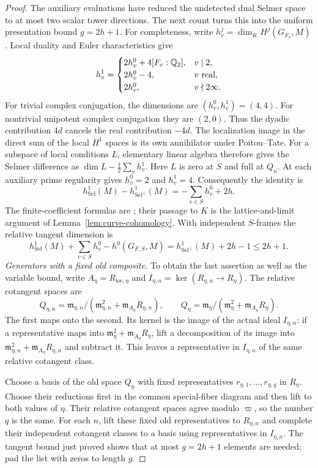 \begin{proof}
The auxiliary evaluations have reduced the undetected dual Selmer
space to at most two scalar tower directions. The next count turns
this into the uniform presentation bound \(g=2h+1\).
For completeness, write $h^j_v=\dim_K H^j(G_{F_v},M)$.
Local duality and Euler characteristics give
\[
 h^1_v=
 \begin{cases}
 2h^0_v+4[F_v:\mathbb Q_2],&v\mid2,\\
 2h^0_v-4,&v\text{ real},\\
 2h^0_v,&v\nmid2\infty.
 \end{cases}
\]
For trivial complex conjugation, the dimensions are
$(h^0_v,h^1_v)=(4,4)$.
For nontrivial unipotent complex conjugation they are $(2,0)$.
Thus the dyadic contribution $4d$ cancels the real contribution
$-4d$.  The localization image in the direct sum of the local
$H^1$ spaces is its own annihilator under Poitou--Tate.
For a subspace of local conditions $L$, elementary linear algebra
therefore gives the Selmer difference as
$\dim L-\tfrac12\sum_v h^1_v$.
Here $L$ is zero at $S$ and full at $Q_n$.
At each auxiliary prime regularity gives $h^0_v=2$ and $h^1_v=4$.
Consequently the identity is
\[
 h^1_{\mathrm{Sel}}(M)-h^1_{\mathrm{Sel}^{\perp}}(M)
   =-\sum_{v\in S}h^0_v+2h.
\]
The finite-coefficient formulas are
\cite[I, Corollary~2.3, Theorems~2.8, 2.13, 4.10, and~5.1]{Milne2006};
their passage to $K$ is the lattice-and-limit argument of
Lemma~\ref{lem:curve-cohomology}.
With independent $S$-frames the relative tangent dimension is
\[
 h^1_{\mathrm{Sel}}(M)+\sum_{v\in S}h^0_v-h^0(G_{F,S},M)
 =h^1_{\mathrm{Sel}^{\perp}}(M)+2h-1
 \leq 2h+1.
\]
\emph{Generators with a fixed old composite.}
To obtain the last assertion as well as the variable bound, write
\(A_\eta=R_{\mathrm{loc},\eta}\) and
\(I_{\eta,n}=\ker(R_{\eta,n}\to R_\eta)\). The relative cotangent
spaces are
\[
 Q_{\eta,n}=\mathfrak m_{\eta,n}/
  (\mathfrak m_{\eta,n}^2+\mathfrak m_{A_\eta}R_{\eta,n}),
 \qquad
 Q_\eta=\mathfrak m_\eta/
  (\mathfrak m_\eta^2+\mathfrak m_{A_\eta}R_\eta).
\]
The first maps onto the second. Its kernel is the image of the
actual ideal \(I_{\eta,n}\): if a representative maps into
\(\mathfrak m_\eta^2+\mathfrak m_{A_\eta}R_\eta\), lift a
decomposition of its image into
\(\mathfrak m_{\eta,n}^2+\mathfrak m_{A_\eta}R_{\eta,n}\) and
subtract it. This leaves a representative in \(I_{\eta,n}\) of the
same relative cotangent class.

Choose a basis of the old space \(Q_\eta\) with fixed representatives
\(r_{\eta,1},\ldots,r_{\eta,q}\) in \(R_\eta\). Choose their
reductions first in the common special-fiber diagram and then lift
to both values of \(\eta\). Their relative cotangent spaces agree
modulo \(\varpi\), so the number \(q\) is the same. For each \(n\),
lift these fixed old representatives to \(R_{\eta,n}\) and complete
their independent cotangent classes to a basis using representatives
in \(I_{\eta,n}\). The tangent bound just proved shows that at most
\(g=2h+1\) elements are needed; pad the list with zeros to length
\(g\).


\end{proof}
